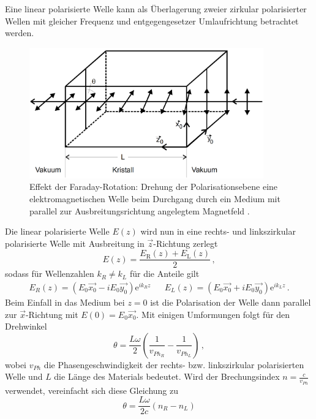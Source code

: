 Eine linear polarisierte Welle kann als Überlagerung zweier zirkular polarisierter Wellen mit gleicher Frequenz
und entgegengesetzer Umlaufrichtung betrachtet werden.
\FloatBarrier
\begin{figure}[h]
    \centering
    \includegraphics[width=0.9\textwidth]{rotation.png}
    \caption{Effekt der Faraday-Rotation: Drehung der Polarisationsebene eine elektromagnetischen Welle beim Durchgang durch ein Medium mit parallel zur Ausbreitungsrichtung angelegtem Magnetfeld \cite{quelle02}.}
    \label{fig:tfig2}
\end{figure}
\FloatBarrier
\noindent
Die linear polarisierte Welle $E(z)$ wird nun in eine rechts- und linkszirkular polarisierte Welle mit Ausbreitung in 
$\vec{z}$-Richtung zerlegt
\begin{equation*}
    E(z) = \frac{E_\text{R}\left(z\right) + E_\text{L}\left(z\right)}{2} \, ,
\end{equation*}
sodass für Wellenzahlen $k_R \neq k_L$ für die Anteile gilt
\begin{align*}
    E_R (z) = \left(E_0 \vec{x_0} - i E_0 \vec{y_0}\right) \text{e}^{i k_R z} && E_L (z) = \left(E_0 \vec{x_0} + i E_0 \vec{y_0}\right) \text{e}^{i k_L z} \, .
\end{align*}
Beim Einfall in das Medium bei $z = 0$ ist die Polarisation der Welle dann parallel zur $\vec{x}$-Richtung mit $E(0) = E_0 \vec{x_0}$.
Mit einigen Umformungen folgt für den Drehwinkel
\begin{equation*}
    \theta = \frac{L \omega}{2} \left(\frac{1}{v_{Ph_R}} - \frac{1}{v_{Ph_L}}\right) \, ,
\end{equation*}
wobei $v_{Ph}$ die Phasengeschwindigkeit der rechts- bzw. linkszirkular polarisierten Welle und $L$ die Länge des Materials
bedeutet. 
Wird der Brechungsindex $n = \frac{c}{v_{Ph}}$ verwendet, vereinfacht sich diese Gleichung zu
\begin{equation*}
    \theta = \frac{L \omega}{2 c} \left(n_R - n_L\right)
\end{equation*}
